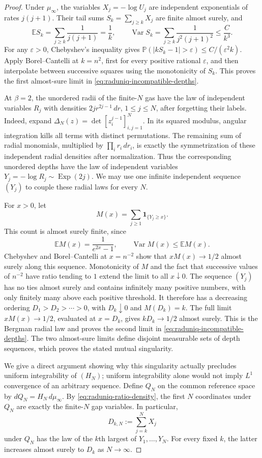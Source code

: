 \documentclass[11pt,a4paper]{article}
\numberwithin{equation}{section}
\theoremstyle{definition}
\theoremstyle{remark}
\begin{document}
\begin{proof}
Under $\mu_\infty$, the variables $X_j=-\log U_j$ are independent
exponentials of rates $j(j+1)$. Their tail sums $S_k=\sum_{j\ge k}X_j$
are finite almost surely, and
\[
 \mathbb ES_k=\sum_{j\ge k}\frac1{j(j+1)}=\frac1k,
 \qquad
 \operatorname{Var}S_k
 =\sum_{j\ge k}\frac1{j^2(j+1)^2}\le\frac C{k^3}.
\]
For any $\varepsilon>0$, Chebyshev's inequality gives
$\mathbb P(|kS_k-1|>\varepsilon)\le C/(\varepsilon^2k)$.
Apply Borel--Cantelli at $k=n^2$, first for every positive rational
$\varepsilon$, and then interpolate between successive squares using
the monotonicity of $S_k$. This proves the first almost-sure limit in
\eqref{eq:raduniq-incompatible-depths}.

At $\beta=2$, the unordered radii of the finite-$N$ gas have the law
of independent variables $R_j$ with densities
$2j r^{2j-1}\,dr$, $1\le j\le N$, after forgetting their labels.
Indeed, expand
$\Delta_N(z)=\det[z_i^{j-1}]_{i,j=1}^N$. In its squared modulus,
angular integration kills all terms with distinct permutations. The
remaining sum of radial monomials, multiplied by $\prod_i r_i\,dr_i$,
is exactly the symmetrization of these independent radial densities
after normalization. Thus the corresponding unordered depths have the
law of independent variables $Y_j=-\log R_j\sim\operatorname{Exp}(2j)$.
We may use one infinite independent sequence $(Y_j)$ to couple these
radial laws for every $N$.

For $x>0$, let
\[
 M(x)=\sum_{j\ge1}\mathbf1_{\{Y_j\ge x\}}.
\]
This count is almost surely finite, since
\[
 \mathbb EM(x)=\frac1{e^{2x}-1},\qquad
 \operatorname{Var}M(x)\le\mathbb EM(x).
\]
Chebyshev and Borel--Cantelli at $x=n^{-2}$ show that
$xM(x)\to1/2$ almost surely along this sequence. Monotonicity of $M$
and the fact that successive values of $n^{-2}$ have ratio tending to
$1$ extend the limit to all $x\downarrow0$.
The sequence $(Y_j)$ has no ties almost surely and contains infinitely
many positive numbers, with only finitely many above each positive
threshold. It therefore has a decreasing ordering
$D_1>D_2>\cdots>0$, with $D_k\downarrow0$ and $M(D_k)=k$.
The full limit $xM(x)\to1/2$, evaluated at $x=D_k$, gives
$kD_k\to1/2$ almost surely. This is the Bergman radial law and proves
the second limit in \eqref{eq:raduniq-incompatible-depths}. The two
almost-sure limits define disjoint measurable sets of depth sequences,
which proves the stated mutual singularity.

We give a direct argument showing why this singularity actually
precludes uniform integrability of $(H_N)$; uniform integrability alone
would not imply $L^1$ convergence of an arbitrary sequence. Define
$Q_N$ on the common reference space by $dQ_N=H_N\,d\mu_\infty$.
By \eqref{eq:raduniq-ratio-density}, the first $N$ coordinates under
$Q_N$ are exactly the finite-$N$ gap variables. In particular,
\[
 D_{k,N}:=\sum_{j=k}^N X_j
\]
under $Q_N$ has the law of the $k$th largest of $Y_1,\ldots,Y_N$.
For every fixed $k$, the latter increases almost surely to $D_k$ as
$N\to\infty$.


\end{proof}
\end{document}

